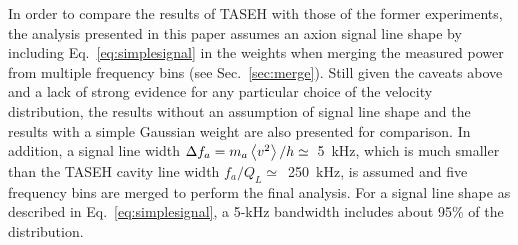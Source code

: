 In order to compare the results of TASEH with those of the former experiments, 
the analysis presented in this paper assumes an axion 
signal line shape by including Eq.~\eqref{eq:simplesignal} in the weights 
when merging the measured power from multiple frequency bins 
(see Sec.~\ref{sec:merge}). Still given the caveats above and a lack of 
strong evidence for any particular choice of the velocity distribution, 
the results without an assumption of signal line shape and the results 
with a simple Gaussian weight are also presented for comparison. 
In addition, a signal line width 
$\Delta f_a=m_a\left<v^2\right>/h\simeq$~5~kHz, which is much smaller than 
the TASEH cavity line width $f_a/Q_L\simeq$~250~kHz, is assumed and 
five frequency bins are merged to perform the final analysis. For a signal 
line shape as described in Eq.~\eqref{eq:simplesignal}, a 5-kHz bandwidth 
includes about 95\% of the distribution.


 
